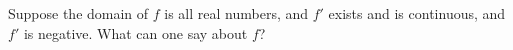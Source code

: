 \documentclass{ximera}
\begin{document}
\begin{problem}
  Suppose the domain of $f$ is all real numbers, and $f'$ exists and
  is continuous, and $f'$ is negative.  What can one say about $f$?
  \begin{multipleChoice}
  \end{multipleChoice}
\end{problem}
\end{document}
